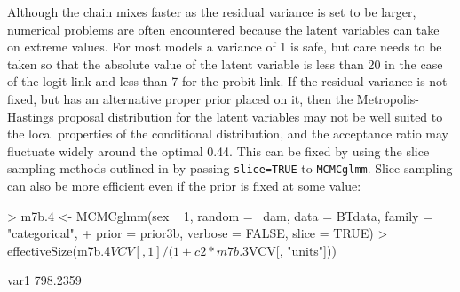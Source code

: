 \documentclass{article}
\begin{document}
Although the chain mixes faster as the residual variance is set to be larger, numerical problems are often encountered because the latent variables can take on extreme values. For most models a variance of 1 is safe, but care needs to be taken so that the absolute value of the latent variable is less than 20 in the case of the logit link and less than 7 for the probit link. If the residual variance is not fixed, but has an alternative proper prior placed on it, then the Metropolis-Hastings proposal distribution for the latent variables may not be well suited to the local properties of the conditional distribution, and the acceptance ratio may fluctuate widely around the optimal 0.44. This can be fixed by using the slice sampling methods outlined in \citet{Damien.1999} by passing \texttt{slice=TRUE} to \texttt{MCMCglmm}. Slice sampling can also be more efficient even if the prior is fixed at some value: 
 
\begin{Schunk}
\begin{Sinput}
> m7b.4 <- MCMCglmm(sex ~ 1, random = ~dam, data = BTdata, family = "categorical", 
+     prior = prior3b, verbose = FALSE, slice = TRUE)
> effectiveSize(m7b.4$VCV[, 1]/(1 + c2 * m7b.3$VCV[, "units"]))
\end{Sinput}
\begin{Soutput}
    var1 
798.2359 
\end{Soutput}
\end{Schunk}

\ifalone


\end{document}
